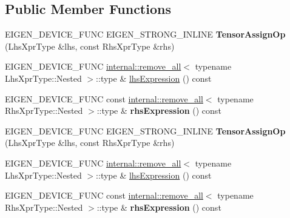 \subsection*{Public Member Functions}
\begin{DoxyCompactItemize}
\item 
\mbox{\label{class_eigen_1_1_tensor_assign_op_ab5fbf0be8d18a3922864d04bfe7ecec0}} 
E\+I\+G\+E\+N\+\_\+\+D\+E\+V\+I\+C\+E\+\_\+\+F\+U\+NC E\+I\+G\+E\+N\+\_\+\+S\+T\+R\+O\+N\+G\+\_\+\+I\+N\+L\+I\+NE {\bfseries Tensor\+Assign\+Op} (Lhs\+Xpr\+Type \&lhs, const Rhs\+Xpr\+Type \&rhs)
\item 
E\+I\+G\+E\+N\+\_\+\+D\+E\+V\+I\+C\+E\+\_\+\+F\+U\+NC \hyperlink{struct_eigen_1_1internal_1_1remove__all}{internal\+::remove\+\_\+all}$<$ typename Lhs\+Xpr\+Type\+::\+Nested $>$\+::type \& \hyperlink{class_eigen_1_1_tensor_assign_op_a1a6f7336727e3f95616014883d514caa}{lhs\+Expression} () const
\item 
\mbox{\label{class_eigen_1_1_tensor_assign_op_a892d03bbcdd877d40a8d640ea3a6ca57}} 
E\+I\+G\+E\+N\+\_\+\+D\+E\+V\+I\+C\+E\+\_\+\+F\+U\+NC const \hyperlink{struct_eigen_1_1internal_1_1remove__all}{internal\+::remove\+\_\+all}$<$ typename Rhs\+Xpr\+Type\+::\+Nested $>$\+::type \& {\bfseries rhs\+Expression} () const
\item 
\mbox{\label{class_eigen_1_1_tensor_assign_op_ab5fbf0be8d18a3922864d04bfe7ecec0}} 
E\+I\+G\+E\+N\+\_\+\+D\+E\+V\+I\+C\+E\+\_\+\+F\+U\+NC E\+I\+G\+E\+N\+\_\+\+S\+T\+R\+O\+N\+G\+\_\+\+I\+N\+L\+I\+NE {\bfseries Tensor\+Assign\+Op} (Lhs\+Xpr\+Type \&lhs, const Rhs\+Xpr\+Type \&rhs)
\item 
E\+I\+G\+E\+N\+\_\+\+D\+E\+V\+I\+C\+E\+\_\+\+F\+U\+NC \hyperlink{struct_eigen_1_1internal_1_1remove__all}{internal\+::remove\+\_\+all}$<$ typename Lhs\+Xpr\+Type\+::\+Nested $>$\+::type \& \hyperlink{class_eigen_1_1_tensor_assign_op_a1a6f7336727e3f95616014883d514caa}{lhs\+Expression} () const
\item 
\mbox{\label{class_eigen_1_1_tensor_assign_op_a892d03bbcdd877d40a8d640ea3a6ca57}} 
E\+I\+G\+E\+N\+\_\+\+D\+E\+V\+I\+C\+E\+\_\+\+F\+U\+NC const \hyperlink{struct_eigen_1_1internal_1_1remove__all}{internal\+::remove\+\_\+all}$<$ typename Rhs\+Xpr\+Type\+::\+Nested $>$\+::type \& {\bfseries rhs\+Expression} () const
\end{DoxyCompactItemize}

